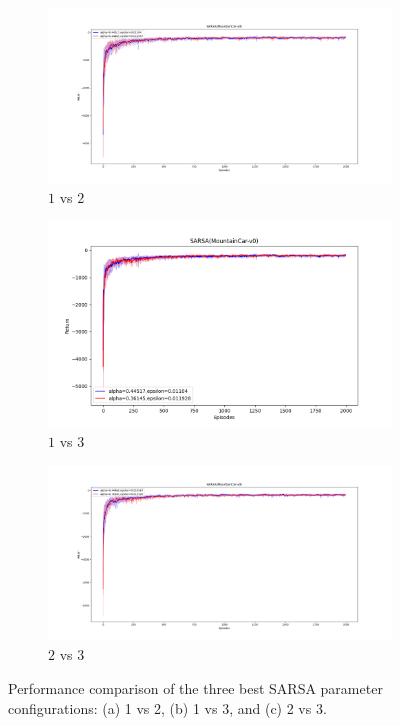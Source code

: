 \documentclass[11pt, a4]{article}
\begin{document}
				\begin{figure}[H]
					\centering
					\begin{subfigure}{.8\textwidth}
						\centering
						\includegraphics[width=\textwidth]{../mountain_car-v0/plots/sarsa_Figure_1.png}
						\caption{$1$ vs $2$}
						\label{fig:sarsamountaincar1vs2}
					\end{subfigure}
					\hfill
					\begin{subfigure}{.8\textwidth}
						\centering
						\includegraphics[width=\textwidth]{../mountain_car-v0/plots/sarsa_Figure_2.png}
						\caption{$1$ vs $3$}
						\label{fig:sarsamountaincar1vs3}
					\end{subfigure}
					\hfill
					\begin{subfigure}{.8\textwidth}
						\centering
						\includegraphics[width=\textwidth]{../mountain_car-v0/plots/sarsa_Figure_3.png}
						\caption{$2$ vs $3$}
						\label{fig:sarsamountaincar2vs3}
					\end{subfigure}
					\caption{Performance comparison of the three best SARSA parameter configurations: (a) 1 vs 2, (b) 1 vs 3, and (c) 2 vs 3.}
					\label{fig:sarsamountaincar}
				\end{figure}
\end{document}
